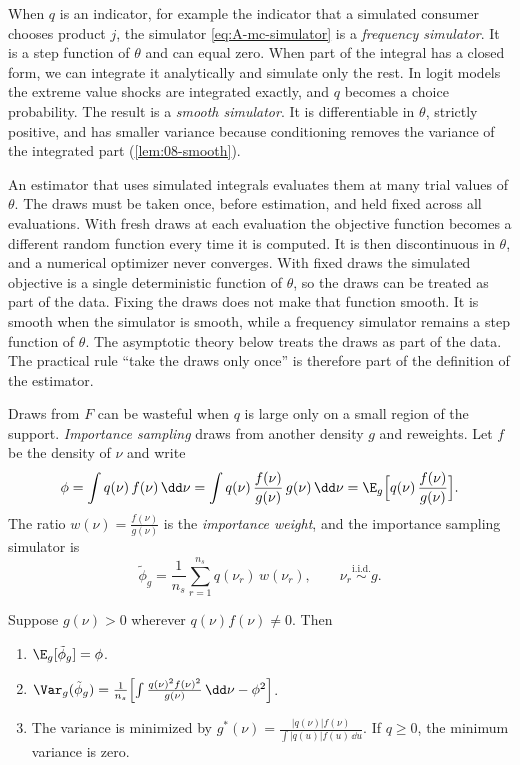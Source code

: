 When $q$ is an indicator, for example the indicator that a simulated consumer chooses product $j$, the simulator
\eqref{eq:A-mc-simulator} is a \emph{frequency simulator}. It is a step function of $\theta$ and can equal zero.
When part of the integral has a closed form, we can integrate it analytically and simulate only the rest. In logit
models the extreme value shocks are integrated exactly, and $q$ becomes a choice probability. The result is a
\emph{smooth simulator}. It is differentiable in $\theta$, strictly positive, and has smaller variance because
conditioning removes the variance of the integrated part (\cref{lem:08-smooth}).

An estimator that uses simulated integrals evaluates them at many trial values of $\theta$. The draws must be taken
once, before estimation, and held fixed across all evaluations. With fresh draws at each evaluation the objective
function becomes a different random function every time it is computed. It is then discontinuous in $\theta$, and a
numerical optimizer never converges. With fixed draws the simulated objective is a single deterministic function
of $\theta$, so the draws can be treated as part of the data. Fixing the draws does not make that function smooth.
It is smooth when the simulator is smooth, while a frequency simulator remains a step function of $\theta$. The asymptotic theory below
treats the draws as part of the data. The practical rule ``take the draws only once'' is therefore part of the definition of the estimator.

Draws from $F$ can be wasteful when $q$ is large only on a small region of the support. \emph{Importance sampling}
draws from another density $g$ and reweights. Let $f$ be the density of $\nu$ and write
\begin{equation*}
  \phi = \int q(\nu)\,f(\nu)\,\dd\nu = \int q(\nu)\,\frac{f(\nu)}{g(\nu)}\,g(\nu)\,\dd\nu
  = \E_g\Bigl[q(\nu)\,\frac{f(\nu)}{g(\nu)}\Bigr].
\end{equation*}
The ratio $w(\nu) = \frac{f(\nu)}{g(\nu)}$ is the \emph{importance weight}, and the importance sampling simulator is
\begin{equation}\label{eq:A-importance}
  \tilde\phi_g = \frac{1}{n_s}\sum_{r=1}^{n_s} q(\nu_r)\,w(\nu_r), \qquad \nu_r \overset{\text{i.i.d.}}{\sim} g.
\end{equation}

\begin{lemma}\label{lem:A-importance}
Suppose $g(\nu) > 0$ wherever $q(\nu)f(\nu) \ne 0$. Then
\begin{enumerate}[label=(\roman*)]
  \item $\E_g[\tilde\phi_g] = \phi$.
  \item $\Var_g(\tilde\phi_g) = \frac{1}{n_s}\Bigl[\int\frac{q(\nu)^2f(\nu)^2}{g(\nu)}\,\dd\nu - \phi^2\Bigr]$.
  \item The variance is minimized by $g^*(\nu) = \frac{|q(\nu)|f(\nu)}{\int|q(u)|f(u)\,\dd u}$. If $q \ge 0$, the
  minimum variance is zero.
\end{enumerate}
\end{lemma}


